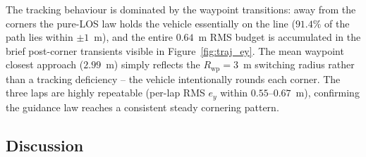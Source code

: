 The tracking behaviour is dominated by the waypoint transitions: away from the corners the pure-LOS law holds the vehicle essentially on the line ($91.4\%$ of the path lies within $\pm1$~m), and the entire $0.64$~m RMS budget is accumulated in the brief post-corner transients visible in Figure~\ref{fig:traj_ey}. The mean waypoint closest approach ($2.99$~m) simply reflects the $R_{\text{wp}}=3$~m switching radius rather than a tracking deficiency -- the vehicle intentionally rounds each corner. The three laps are highly repeatable (per-lap RMS $e_y$ within $0.55$--$0.67$~m), confirming the guidance law reaches a consistent steady cornering pattern.

\subsection{Discussion}

